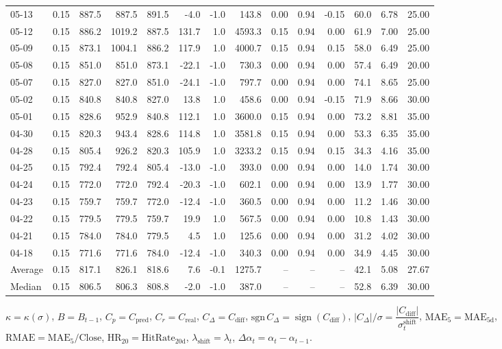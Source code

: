 \begin{threeparttable}
{\begin{tabular}{lrrrrrrrrrrrrr}
05-13 & 0.15 & 887.5 & 887.5 & 891.5 & -4.0 & -1.0 & 143.8 & 0.00 & 0.94 & -0.15 & 60.0 & 6.78 & 25.00 \\
05-12 & 0.15 & 886.2 & 1019.2 & 887.5 & 131.7 & 1.0 & 4593.3 & 0.15 & 0.94 & 0.00 & 61.9 & 7.00 & 25.00 \\
05-09 & 0.15 & 873.1 & 1004.1 & 886.2 & 117.9 & 1.0 & 4000.7 & 0.15 & 0.94 & 0.15 & 58.0 & 6.49 & 25.00 \\
05-08 & 0.15 & 851.0 & 851.0 & 873.1 & -22.1 & -1.0 & 730.3 & 0.00 & 0.94 & 0.00 & 57.4 & 6.49 & 20.00 \\
05-07 & 0.15 & 827.0 & 827.0 & 851.0 & -24.1 & -1.0 & 797.7 & 0.00 & 0.94 & 0.00 & 74.1 & 8.65 & 25.00 \\
05-02 & 0.15 & 840.8 & 840.8 & 827.0 & 13.8 & 1.0 & 458.6 & 0.00 & 0.94 & -0.15 & 71.9 & 8.66 & 30.00 \\
05-01 & 0.15 & 828.6 & 952.9 & 840.8 & 112.1 & 1.0 & 3600.0 & 0.15 & 0.94 & 0.00 & 73.2 & 8.81 & 35.00 \\
04-30 & 0.15 & 820.3 & 943.4 & 828.6 & 114.8 & 1.0 & 3581.8 & 0.15 & 0.94 & 0.00 & 53.3 & 6.35 & 35.00 \\
04-28 & 0.15 & 805.4 & 926.2 & 820.3 & 105.9 & 1.0 & 3233.2 & 0.15 & 0.94 & 0.15 & 34.3 & 4.16 & 35.00 \\
04-25 & 0.15 & 792.4 & 792.4 & 805.4 & -13.0 & -1.0 & 393.0 & 0.00 & 0.94 & 0.00 & 14.0 & 1.74 & 30.00 \\
04-24 & 0.15 & 772.0 & 772.0 & 792.4 & -20.3 & -1.0 & 602.1 & 0.00 & 0.94 & 0.00 & 13.9 & 1.77 & 30.00 \\
04-23 & 0.15 & 759.7 & 759.7 & 772.0 & -12.4 & -1.0 & 360.5 & 0.00 & 0.94 & 0.00 & 11.2 & 1.46 & 30.00 \\
04-22 & 0.15 & 779.5 & 779.5 & 759.7 & 19.9 & 1.0 & 567.5 & 0.00 & 0.94 & 0.00 & 10.8 & 1.43 & 30.00 \\
04-21 & 0.15 & 784.0 & 784.0 & 779.5 & 4.5 & 1.0 & 125.6 & 0.00 & 0.94 & 0.00 & 31.2 & 4.02 & 30.00 \\
04-18 & 0.15 & 771.6 & 771.6 & 784.0 & -12.4 & -1.0 & 340.3 & 0.00 & 0.94 & 0.00 & 34.9 & 4.45 & 30.00 \\
Average & 0.15 & 817.1 & 826.1 & 818.6 & 7.6 & -0.1 & 1275.7 & -- & -- & -- & 42.1 & 5.08 & 27.67 \\
Median & 0.15 & 806.5 & 806.3 & 808.8 & -2.0 & -1.0 & 387.0 & -- & -- & -- & 52.8 & 6.39 & 30.00 \\
\bottomrule
\end{tabular}
}%
\begin{tablenotes}\footnotesize
\item $\kappa=\kappa(\sigma)$, $B=B_{t-1}$, $C_p=C_{\text{pred}}$, $C_r=C_{\text{real}}$, $C_\Delta=C_{\text{diff}}$, $\mathrm{sgn}\,C_\Delta=\operatorname{sign}(C_{\text{diff}})$, $|C_\Delta|/\sigma=\dfrac{|C_{\text{diff}}|}{\sigma_t^{\text{shift}}}$, $\mathrm{MAE}_5=\mathrm{MAE}_{5\text{d}}$, $\mathrm{RMAE}= \mathrm{MAE}_5 / \text{Close}$, $\mathrm{HR}_{20}=\mathrm{HitRate}_{20\text{d}}$, 
$\lambda_{\text{shift}}=\lambda_t$, 
$\Delta\alpha_t=\alpha_t-\alpha_{t-1}$.
\end{tablenotes}
\end{threeparttable}
\endgroup